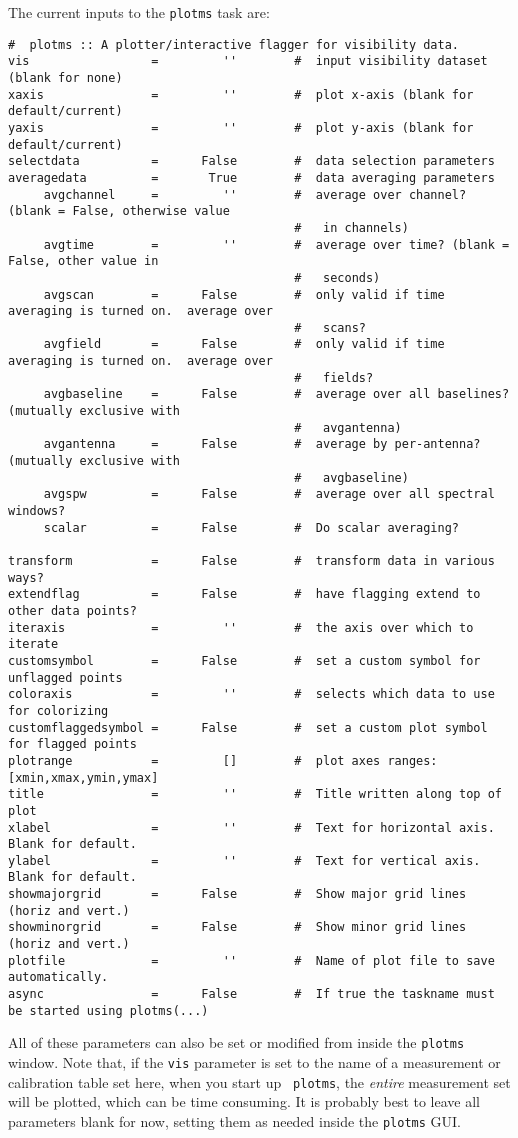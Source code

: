 The current inputs to the {\tt plotms} task are:
\small
\begin{verbatim}
#  plotms :: A plotter/interactive flagger for visibility data.
vis                 =         ''        #  input visibility dataset (blank for none)
xaxis               =         ''        #  plot x-axis (blank for default/current)
yaxis               =         ''        #  plot y-axis (blank for default/current)
selectdata          =      False        #  data selection parameters
averagedata         =       True        #  data averaging parameters
     avgchannel     =         ''        #  average over channel?  (blank = False, otherwise value
                                        #   in channels)
     avgtime        =         ''        #  average over time? (blank = False, other value in
                                        #   seconds)
     avgscan        =      False        #  only valid if time averaging is turned on.  average over
                                        #   scans?
     avgfield       =      False        #  only valid if time averaging is turned on.  average over
                                        #   fields?
     avgbaseline    =      False        #  average over all baselines?  (mutually exclusive with
                                        #   avgantenna)
     avgantenna     =      False        #  average by per-antenna?  (mutually exclusive with
                                        #   avgbaseline)
     avgspw         =      False        #  average over all spectral windows?
     scalar         =      False        #  Do scalar averaging?

transform           =      False        #  transform data in various ways?
extendflag          =      False        #  have flagging extend to other data points?
iteraxis            =         ''        #  the axis over which to iterate
customsymbol        =      False        #  set a custom symbol for unflagged points
coloraxis           =         ''        #  selects which data to use for colorizing
customflaggedsymbol =      False        #  set a custom plot symbol for flagged points
plotrange           =         []        #  plot axes ranges: [xmin,xmax,ymin,ymax]
title               =         ''        #  Title written along top of plot
xlabel              =         ''        #  Text for horizontal axis. Blank for default.
ylabel              =         ''        #  Text for vertical axis. Blank for default.
showmajorgrid       =      False        #  Show major grid lines (horiz and vert.)
showminorgrid       =      False        #  Show minor grid lines (horiz and vert.)
plotfile            =         ''        #  Name of plot file to save automatically.
async               =      False        #  If true the taskname must be started using plotms(...)

\end{verbatim}
\normalsize All of these parameters can also be set or modified from
inside the {\tt plotms} window. Note that, if the {\tt vis} parameter
is set to the name of a measurement or calibration table set here, when you start up {\tt
  plotms}, the {\it entire} measurement set will be plotted, which can
be time consuming. It is probably best to leave all parameters blank
for now, setting them as needed inside the {\tt plotms} GUI.

